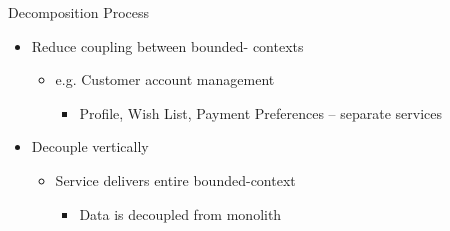 \documentclass{slide}
\begin{document}
\begin{frame}{Decomposition Process}
\vspace{1pt}
{\huge
\begin{itemize}
    \item Reduce coupling between bounded- contexts
    \vspace{1mm}
    \begin{itemize}
        \LARGE\item e.g. Customer account management
        \begin{itemize}
            \Large\item Profile, Wish List, Payment Preferences -- separate services
        \end{itemize}
    \end{itemize}
    \vspace{3mm}
    \item Decouple vertically
    \vspace{1mm}
    \begin{itemize}
        \LARGE\item Service delivers entire bounded-context
        \begin{itemize}
            \Large\item Data is decoupled from monolith
        \end{itemize}
    \end{itemize}
\end{itemize}
}
\end{frame}
\end{document}
